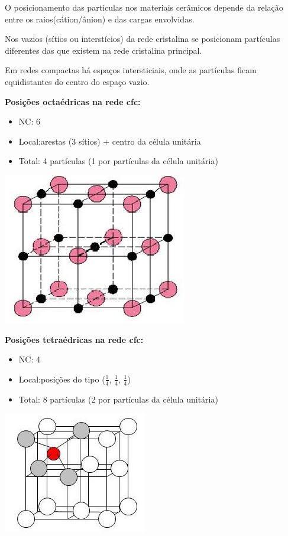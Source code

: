  O posicionamento das partículas nos materiais cerâmicos depende da relação entre os raios(cátion/ânion) e das cargas envolvidas.
 
 Nos vazios (sítios ou interstícios) da rede cristalina se posicionam partículas diferentes das que existem na rede cristalina principal.
 
 Em redes compactas há espaços intersticiais, onde as partículas ficam equidistantes do centro do espaço vazio.
 

\textbf{Posições octaédricas na rede cfc:}
 \begin{itemize}
 	
 	\setlength{\parskip}{0pt}
 	\setlength{\itemsep}{0pt plus 1pt}
 	
 	\item NC: 6
 	\item Local:arestas (3 sítios) + centro da célula unitária
 	\item Total: 4 partículas (1 por partículas da célula unitária)
 \end{itemize}
 \includegraphics[scale=0.5,trim={0 0 0 0}]{figures/occfc}
 
 
\textbf{ Posições tetraédricas na rede cfc:}
  \begin{itemize}
 	
 	\setlength{\parskip}{0pt}
 	\setlength{\itemsep}{0pt plus 1pt}
 	
 	\item NC: 4
 	\item Local:posições do tipo ($\frac{1}{4}$, $\frac{1}{4}$, $\frac{1}{4}$)
 	\item Total: 8 partículas (2 por partículas	da célula unitária)
 \end{itemize}
 \includegraphics[scale=0.5,trim={0 0 0 0}]{figures/tetcfc}
 
